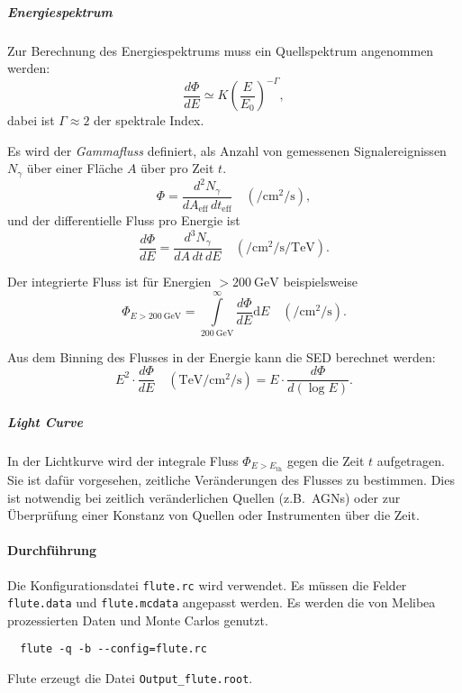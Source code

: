 \subparagraph{Energiespektrum}

Zur Berechnung des Energiespektrums muss ein Quellspektrum angenommen werden:
\begin{equation}%
  \label{eq:photon_index}
  \frac{d\Phi}{dE} \simeq K {\left(\frac{E}{E_0}\right)}^{-\Gamma},
\end{equation}
dabei ist $\Gamma \approx 2$ der spektrale Index.

Es wird der \textit{Gammafluss} definiert,
als Anzahl von gemessenen Signalereignissen $N_{\gamma}$
über
einer Fläche $A$ über pro Zeit $t$.
\begin{equation}%
  \label{eq:gamma_flux}
  \Phi = \frac{d^2 N_{\gamma}}{dA_{\text{eff}}\, dt_{\text{eff}}}
  \quad \left(\si{\per\centi\meter\tothe2\per\second}\right),
\end{equation}
und der differentielle Fluss pro Energie ist
\begin{equation}%
  \label{eq:differential_energy_spectrum}
  \frac{d\Phi}{dE} = \frac{d^3N_{\gamma}}{dA\, dt\, dE}
  \quad \left(\si{\per\centi\meter\tothe2\per\second\per\tera\electronvolt}\right).
\end{equation}

Der integrierte Fluss ist für Energien $> \SI{200}{\giga\electronvolt}$
beispielsweise
\begin{equation}%
  \label{eq:integral_flux}
  \Phi_{E > \SI{200}{\giga\electronvolt}} =
    \int\limits_{\SI{200}{\giga\electronvolt}}^{\infty} \frac{d \Phi}{dE}
    \text{d} E
  \quad \left(\si{\per\centi\meter\tothe2\per\second}\right).
\end{equation}

Aus dem Binning des Flusses in der Energie
kann die SED berechnet werden:
\begin{equation}%
  \label{eq:spectral_energy_distribution}
  E^2 \cdot \frac{d \Phi}{dE}
  \quad \left(\si{\tera\electronvolt\per\centi\meter\tothe2\per\second}\right)
  = E \cdot \frac{d \Phi}{d \left(\log E\right)}.
\end{equation}

\subparagraph{Light Curve}
In der Lichtkurve wird
der integrale Fluss $\Phi_{E > E_\text{th}}$ gegen die Zeit $t$
aufgetragen.
Sie ist dafür vorgesehen,
zeitliche Veränderungen des Flusses zu bestimmen.
Dies ist notwendig bei zeitlich veränderlichen Quellen
(z.B.\ AGNs)
oder zur Überprüfung einer Konstanz von Quellen oder Instrumenten
über die Zeit.



\paragraph{Durchführung}%

Die Konfigurationsdatei \texttt{flute.rc} wird verwendet.
Es müssen die Felder \texttt{flute.data} und \texttt{flute.mcdata} angepasst werden.
Es werden die von Melibea prozessierten Daten und Monte Carlos genutzt.


\begin{lstlisting}
  flute -q -b --config=flute.rc
\end{lstlisting}

Flute erzeugt die Datei \texttt{Output\_flute.root}.

